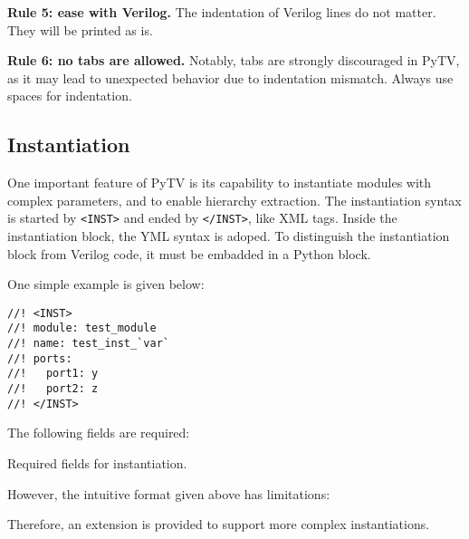 \textbf{Rule 5: ease with Verilog.}
The indentation of Verilog lines do not matter.
They will be printed as is.

\textbf{Rule 6: no tabs are allowed.}
Notably, tabs are strongly discouraged in PyTV, as it may lead to unexpected behavior due to indentation mismatch.
Always use spaces for indentation.

\subsection{Instantiation}
One important feature of PyTV is its capability to instantiate modules with complex parameters,
and to enable hierarchy extraction.
The instantiation syntax is started by \texttt{<INST>} and ended by \texttt{</INST>}, like XML tags.
Inside the instantiation block, the YML syntax is adoped.
To distinguish the instantiation block from Verilog code,
it must be embadded in a Python block.

One simple example is given below:
\begin{verbatim}
//! <INST>
//! module: test_module
//! name: test_inst_`var`
//! ports:
//!   port1: y
//!   port2: z
//! </INST>
\end{verbatim}
The following fields are required:
\begin{table}
  \caption{Required fields for instantiation.}
\end{table}

However, the intuitive format given above has limitations:

Therefore, an extension is provided to support more complex instantiations.

